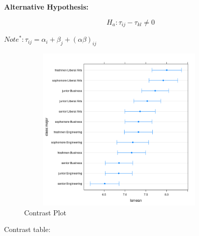 \documentclass{article} %
\begin{document}
\textbf{Alternative Hypothesis:}

$$H_a :  \tau_{ij} - \tau_{kl} \neq 0$$

$Note^*:  \tau_{ij} = \alpha_{i} + \beta_{j} + (\alpha \beta)_{ij}$

\begin{figure}[H]
	\begin{center}
		\includegraphics[height=8cm, width=10cm]{9.png}
	\end{center}
	\caption{Contrast Plot}
\end{figure}


Contrast table:
\end{document}
